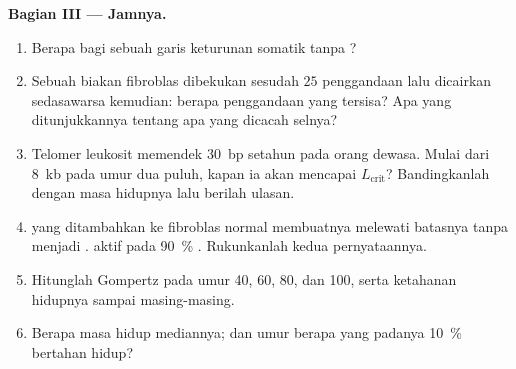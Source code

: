 \begin{problem}
\medskip
\noindent\textbf{Bagian III --- Jamnya.}
\begin{enumerate}[resume]
  \item Berapa  bagi sebuah garis keturunan somatik tanpa ?
  \item Sebuah biakan fibroblas dibekukan sesudah $25$ penggandaan lalu dicairkan
        sedasawarsa kemudian: berapa penggandaan yang tersisa? Apa yang ditunjukkannya tentang apa
        yang dicacah selnya?
  \item Telomer leukosit memendek \qty{30}{bp} setahun pada orang dewasa.
        Mulai dari \qty{8}{kb} pada umur dua puluh, kapan ia akan mencapai
        $L_{\text{crit}}$? Bandingkanlah dengan masa hidupnya lalu berilah ulasan.
  \item {} yang ditambahkan ke fibroblas normal membuatnya melewati batasnya
        tanpa menjadi .  aktif pada \qty{90}{\%}
        . Rukunkanlah kedua pernyataannya.
  \item Hitunglah  Gompertz pada umur 40, 60, 80, dan 100, serta
        ketahanan hidupnya sampai masing-masing.
  \item Berapa masa hidup mediannya; dan umur berapa yang padanya \qty{10}{\%} bertahan hidup?
\end{enumerate}


\end{problem}
